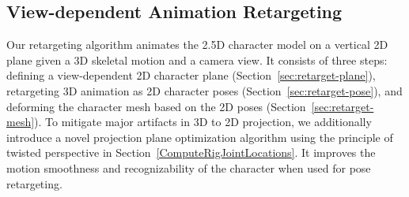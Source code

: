 \subsection{View-dependent Animation Retargeting}
\label{sec:retarget}
Our retargeting algorithm animates the 2.5D character model on a vertical 2D plane given a 3D skeletal motion and a camera view. It consists of three steps: defining a view-dependent 2D character plane (Section~\ref{sec:retarget-plane}), retargeting 3D animation as 2D character poses (Section~\ref{sec:retarget-pose}), and deforming the character mesh based on the 2D poses (Section~\ref{sec:retarget-mesh}). To mitigate major artifacts in 3D to 2D projection, we additionally introduce a novel projection plane optimization algorithm using the principle of twisted perspective in Section~\ref{ComputeRigJointLocations}. It improves the motion smoothness and recognizability of the character when used for pose retargeting.





